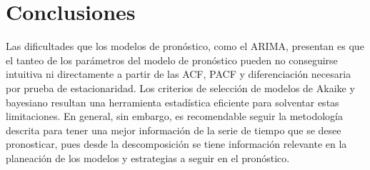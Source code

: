 \documentclass{elsarticle}
\begin{document}
\section{Conclusiones}
\label{conclusiones}

Las dificultades que los modelos de pronóstico, como el ARIMA, presentan es que el tanteo de los parámetros del modelo de pronóstico pueden no conseguirse intuitiva ni directamente a partir de las ACF, PACF y diferenciación necesaria por prueba de estacionaridad. Los criterios de selección de modelos de Akaike y bayesiano resultan una herramienta estadística eficiente para solventar estas limitaciones. En general, sin embargo, es recomendable seguir la metodología descrita para tener una mejor información de la serie de tiempo que se desee pronosticar, pues desde la descomposición se tiene información relevante en la planeación de los modelos y estrategias a seguir en el pronóstico.


\end{document}
